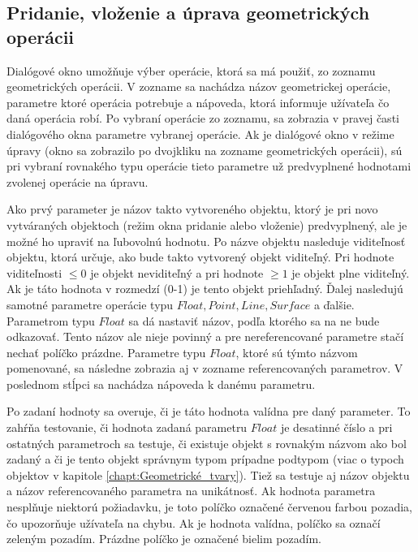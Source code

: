 \subsection{Pridanie, vloženie a úprava geometrických operácii} 
Dialógové okno umožňuje výber operácie,  ktorá sa má použiť, zo zoznamu geometrických operácii. V zozname sa nachádza názov geometrickej operácie, parametre ktoré operácia potrebuje a nápoveda, ktorá informuje užívateľa čo daná operácia robí.
Po vybraní operácie zo zoznamu, sa zobrazia v pravej časti dialógového okna parametre vybranej operácie. Ak je dialógové okno v režime úpravy (okno sa zobrazilo po dvojkliku na zozname geometrických operácii), sú pri vybraní rovnakého typu operácie tieto parametre už predvyplnené hodnotami zvolenej operácie na úpravu.

Ako prvý parameter je názov takto vytvoreného objektu, ktorý je pri novo vytváraných objektoch (režim okna pridanie alebo vloženie) predvyplnený, ale je možné ho upraviť na ľubovolnú hodnotu.  
Po názve objektu nasleduje viditeľnosť objektu, ktorá určuje, ako bude takto vytvorený objekt viditeľný. Pri hodnote viditeľnosti $\leq0$ je objekt neviditeľný a pri hodnote $\geq1$ je objekt plne viditeľný. Ak je táto hodnota v rozmedzí (0-1) je tento objekt priehľadný. 
Ďalej nasledujú samotné parametre operácie typu $Float,  Point, Line, Surface$ a ďalšie. Parametrom typu $Float$ sa dá nastaviť názov, podľa ktorého sa na ne bude odkazovať. Tento názov ale nieje povinný a pre nereferencované parametre stačí nechať políčko prázdne. Parametre typu $Float$, ktoré sú týmto názvom pomenované, sa následne zobrazia aj v zozname referencovaných parametrov.
V poslednom stĺpci sa nachádza nápoveda k danému parametru.

Po zadaní hodnoty sa overuje, či je táto hodnota valídna pre daný parameter. To zahŕňa testovanie, či hodnota zadaná parametru $Float$ je desatinné číslo a pri ostatných parametroch sa testuje, či existuje objekt s rovnakým názvom ako bol zadaný a či je tento objekt správnym typom prípadne podtypom (viac o typoch objektov v kapitole  \ref{chapt:Geometrické_tvary}). Tiež sa testuje aj názov objektu a názov referencovaného parametra na unikátnosť.
Ak hodnota parametra nesplňuje niektorú požiadavku, je toto políčko označené červenou farbou pozadia, čo upozorňuje užívateľa na chybu. Ak je hodnota valídna, políčko sa označí zeleným pozadím. Prázdne políčko je označené bielim pozadím. 

